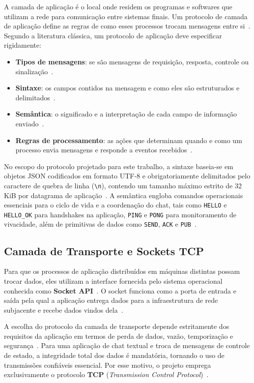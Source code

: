 \documentclass[12pt, a4paper]{article}
\begin{document}
A camada de aplicação é o local onde residem os programas e softwares que utilizam a rede para comunicação entre sistemas finais. Um protocolo de camada de aplicação define as regras de como esses processos trocam mensagens entre si~\cite{kurose}. Segundo a literatura clássica, um protocolo de aplicação deve especificar rigidamente:
\begin{itemize}
    \item \textbf{Tipos de mensagens}: se são mensagens de requisição, resposta, controle ou sinalização~\cite{kurose}.
    \item \textbf{Sintaxe}: os campos contidos na mensagem e como eles são estruturados e delimitados~\cite{kurose}.
    \item \textbf{Semântica}: o significado e a interpretação de cada campo de informação enviado~\cite{kurose}.
    \item \textbf{Regras de processamento}: as ações que determinam quando e como um processo envia mensagens e responde a eventos recebidos~\cite{kurose}.
\end{itemize}

No escopo do protocolo projetado para este trabalho, a sintaxe baseia-se em objetos JSON codificados em formato UTF-8 e obrigatoriamente delimitados pelo caractere de quebra de linha (\verb|\n|), contendo um tamanho máximo estrito de 32 KiB por datagrama de aplicação~\cite{pyp2p}. A semântica engloba comandos operacionais essenciais para o ciclo de vida e a coordenação do chat, tais como \texttt{HELLO} e \texttt{HELLO\_OK} para handshakes na aplicação, \texttt{PING} e \texttt{PONG} para monitoramento de vivacidade, além de primitivas de dados como \texttt{SEND}, \texttt{ACK} e \texttt{PUB}~\cite{pyp2p}.

\subsection{Camada de Transporte e Sockets TCP}
Para que os processos de aplicação distribuídos em máquinas distintas possam trocar dados, eles utilizam a interface fornecida pelo sistema operacional conhecida como \textbf{Socket API}~\cite{kurose}. O socket funciona como a porta de entrada e saída pela qual a aplicação entrega dados para a infraestrutura de rede subjacente e recebe dados vindos dela~\cite{kurose}.

A escolha do protocolo da camada de transporte depende estritamente dos requisitos da aplicação em termos de perda de dados, vazão, temporização e segurança~\cite{kurose}. Para uma aplicação de chat textual e troca de mensagens de controle de estado, a integridade total dos dados é mandatória, tornando o uso de transmissões confiáveis essencial. Por esse motivo, o projeto emprega exclusivamente o protocolo \textbf{TCP} (\textit{Transmission Control Protocol})~\cite{pyp2p}.
\end{document}

